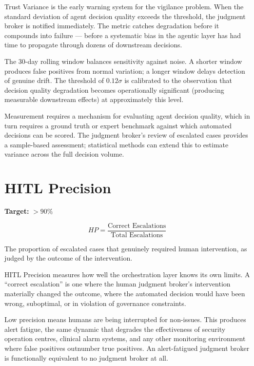 Trust Variance is the early warning system for the vigilance problem. When the standard deviation of agent decision quality exceeds the threshold, the judgment broker is notified immediately. The metric catches degradation before it compounds into failure --- before a systematic bias in the agentic layer has had time to propagate through dozens of downstream decisions.

The 30-day rolling window balances sensitivity against noise. A shorter window produces false positives from normal variation; a longer window delays detection of genuine drift. The threshold of $0.12\sigma$ is calibrated to the observation that decision quality degradation becomes operationally significant (producing measurable downstream effects) at approximately this level.

Measurement requires a mechanism for evaluating agent decision quality, which in turn requires a ground truth or expert benchmark against which automated decisions can be scored. The judgment broker's review of escalated cases provides a sample-based assessment; statistical methods can extend this to estimate variance across the full decision volume.

\section{HITL Precision}

\begin{definitionbox}[title={Human-in-the-Loop Precision (HP)}]
\textbf{Target:} $> 90\%$

\[
HP = \frac{\text{Correct Escalations}}{\text{Total Escalations}}
\]

The proportion of escalated cases that genuinely required human intervention, as judged by the outcome of the intervention.
\end{definitionbox}

HITL Precision measures how well the orchestration layer knows its own limits. A ``correct escalation'' is one where the human judgment broker's intervention materially changed the outcome, where the automated decision would have been wrong, suboptimal, or in violation of governance constraints.

Low precision means humans are being interrupted for non-issues. This produces alert fatigue, the same dynamic that degrades the effectiveness of security operation centres, clinical alarm systems, and any other monitoring environment where false positives outnumber true positives. An alert-fatigued judgment broker is functionally equivalent to no judgment broker at all.


